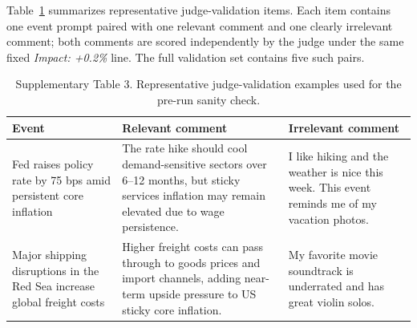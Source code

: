 \documentclass[11pt]{article}
\begin{document}
Table~\ref{tab:judge_examples} summarizes representative judge-validation items. Each item contains one event prompt paired with one relevant comment and one clearly irrelevant comment; both comments are scored independently by the judge under the same fixed \emph{Impact: +0.2\%} line. The full validation set contains five such pairs.

\begin{table}[H]
\caption{Supplementary Table 3. Representative judge-validation examples used for the pre-run sanity check.}
\label{tab:judge_examples}
\begin{tabular}{p{4.4cm}p{5.0cm}p{5.0cm}}
\hline
Event & Relevant comment & Irrelevant comment \\
\midrule
Fed raises policy rate by 75 bps amid persistent core inflation & The rate hike should cool demand-sensitive sectors over 6--12 months, but sticky services inflation may remain elevated due to wage persistence. & I like hiking and the weather is nice this week. This event reminds me of my vacation photos. \\
Major shipping disruptions in the Red Sea increase global freight costs & Higher freight costs can pass through to goods prices and import channels, adding near-term upside pressure to US sticky core inflation. & My favorite movie soundtrack is underrated and has great violin solos. \\
\bottomrule
\end{tabular}
\end{table}



\end{document}

